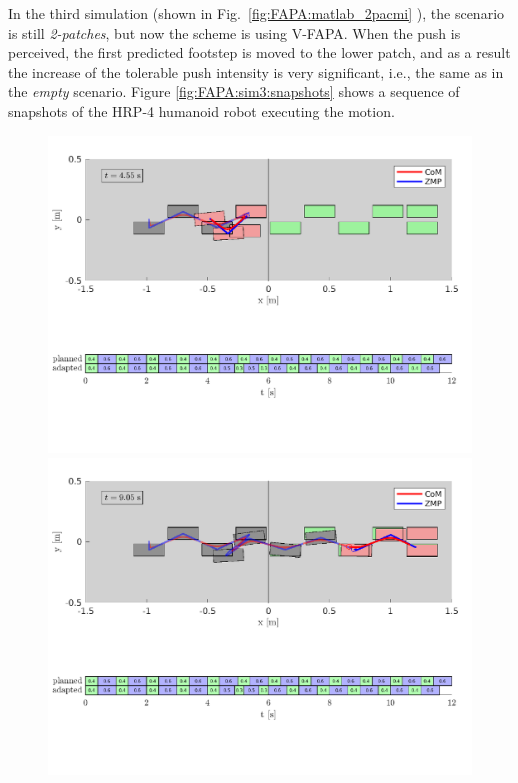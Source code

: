 In the third simulation (shown in Fig.~\ref{fig:FAPA:matlab_2pacmi} ), the scenario is still {\em 2-patches}, but now the scheme is using V-FAPA. When the push is perceived, the first predicted footstep is moved to the lower patch, and as a result the increase of the tolerable push intensity is very significant, i.e., the same as in the {\em empty} scenario.  Figure \ref{fig:FAPA:sim3:snapshots} shows a sequence of snapshots of the HRP-4 humanoid robot executing the motion.
\begin{figure}
    \centering
    \includegraphics[trim={0 5.9cm 0 0.7cm},clip,width=\textwidth]{figures/two-patches-mixed-integer-after-push.pdf}
    \includegraphics[trim={0 5.9cm 0 0.7cm},clip,width=\textwidth]{figures/two-patches-mixed-integer-completing-task.pdf}

\end{figure}
